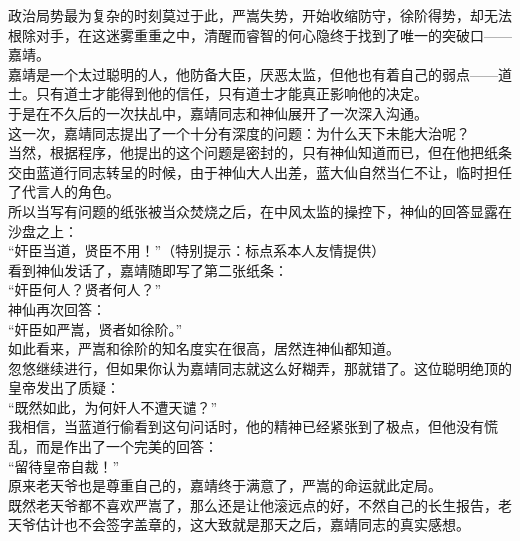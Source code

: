 \begin{multicols}{\theparacolNo}
政治局势最为复杂的时刻莫过于此，严嵩失势，开始收缩防守，徐阶得势，却无法根除对手，在这迷雾重重之中，清醒而睿智的何心隐终于找到了唯一的突破口——嘉靖。\\

嘉靖是一个太过聪明的人，他防备大臣，厌恶太监，但他也有着自己的弱点——道士。只有道士才能得到他的信任，只有道士才能真正影响他的决定。\\

于是在不久后的一次扶乩中，嘉靖同志和神仙展开了一次深入沟通。\\

这一次，嘉靖同志提出了一个十分有深度的问题：为什么天下未能大治呢？\\

当然，根据程序，他提出的这个问题是密封的，只有神仙知道而已，但在他把纸条交由蓝道行同志转呈的时候，由于神仙大人出差，蓝大仙自然当仁不让，临时担任了代言人的角色。\\

所以当写有问题的纸张被当众焚烧之后，在中风太监的操控下，神仙的回答显露在沙盘之上：\\

“奸臣当道，贤臣不用！”（特别提示：标点系本人友情提供）\\

看到神仙发话了，嘉靖随即写了第二张纸条：\\

“奸臣何人？贤者何人？”\\

神仙再次回答：\\

“奸臣如严嵩，贤者如徐阶。”\\

如此看来，严嵩和徐阶的知名度实在很高，居然连神仙都知道。\\

忽悠继续进行，但如果你认为嘉靖同志就这么好糊弄，那就错了。这位聪明绝顶的皇帝发出了质疑：\\

“既然如此，为何奸人不遭天谴？”\\

我相信，当蓝道行偷看到这句问话时，他的精神已经紧张到了极点，但他没有慌乱，而是作出了一个完美的回答：\\

“留待皇帝自裁！”\\

原来老天爷也是尊重自己的，嘉靖终于满意了，严嵩的命运就此定局。\\

既然老天爷都不喜欢严嵩了，那么还是让他滚远点的好，不然自己的长生报告，老天爷估计也不会签字盖章的，这大致就是那天之后，嘉靖同志的真实感想。\\


\end{multicols}
